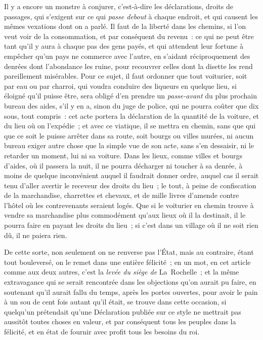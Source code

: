 \documentclass[french,twoside]{book} %
\begin{document}
Il y a encore un monstre à conjurer, c’est-à-dire les déclarations, droits de passages, qui s’exigent sur ce qui {\itshape passe debout} à chaque endroit, et qui causent les mêmes vexations dont on a parlé. Il faut de la liberté dans les chemins, si l’on veut voir de la consommation, et par conséquent du revenu : ce qui ne peut être tant qu’il y aura à chaque pas des gens payés, et qui attendent leur fortune à empêcher qu’un pays ne commerce avec l’autre, en s’aidant réciproquement des denrées dont l’abondance les ruine, pour recouvrer celles dont la disette les rend pareillement misérables. Pour ce sujet, il faut ordonner que tout voiturier, soit par eau ou par charroi, qui voudra conduire des liqueurs en quelque lieu, si éloigné qu’il puisse être, sera obligé d’en prendre un {\itshape passe-avant} du plus prochain bureau des aides, s’il y en a, sinon du juge de police, qui ne pourra coûter que dix sous, tout compris : cet acte portera la déclaration de la quantité de la voiture, et du lieu où on l’expédie ; et avec ce viatique, il se mettra en chemin, sans que qui que ce soit le puisse arrêter dans sa route, soit bourgs ou villes murées, ni aucun bureau exiger autre chose que la simple vue de son acte, sans s’en dessaisir, ni le retarder un moment, lui ni sa voiture. Dans les lieux, comme villes et bourgs d’aides, où il passera la nuit, il ne pourra décharger ni toucher à sa denrée, à moins de quelque inconvénient auquel il faudrait donner ordre, auquel cas il serait tenu d’aller avertir le receveur des droits du lieu ; le tout, à peine de confiscation de la marchandise, charrettes et chevaux, et de mille livres d’amende contre l’hôtel où les contrevenants seraient logés. Que si le voiturier en chemin trouve à vendre sa marchandise plus commodément qu’aux lieux où il la destinait, il le pourra faire en payant les droits du lieu ; si c’est dans un village où il ne soit rien dû, il ne paiera rien.\par
De cette sorte, non seulement on ne renverse pas l’État, mais au contraire, étant tout bouleversé, on le remet dans une entière félicité ; en un mot, en cet article comme aux deux autres, c’est la {\itshape levée du siège de} La Rochelle ; et la même extravagance qui se serait rencontrée dans les objections qu’on aurait pu faire, en soutenant qu’il aurait fallu du temps, après les portes ouvertes, pour avoir le pain à un sou de cent fois autant qu’il était, se trouve dans cette occasion, si quelqu’un prétendait qu’une Déclaration publiée sur ce style ne mettrait pas aussitôt toutes choses en valeur, et par conséquent tous les peuples dans la félicité, et en état de fournir avec profit tous les besoins du roi.\par
\end{document}
